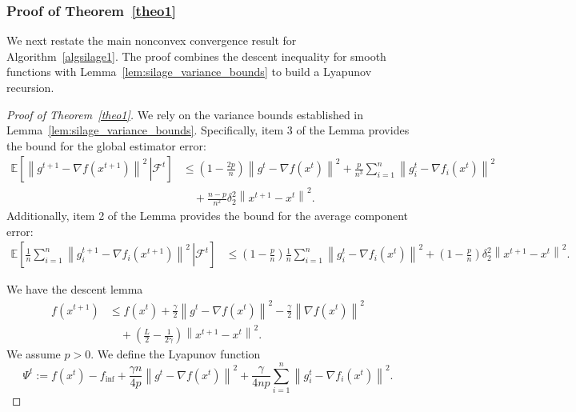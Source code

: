 \documentclass{article}
\newcommand{\sqn}[1]{\left\| #1 \right\|^2}
\newcommand{\finf}{f_\mathrm{inf}}
\newcommand{\eqdef}{:=}
\newcommand{\Expb}[2]{\mathbb{E}\!\left[\left. #1\,\right|#2 \right]}
\newcommand{\Expc}[1]{\Expb{#1}{\mathcal{F}^t}}
\theoremstyle{plain}
\begin{document}
\subsubsection*{Proof of Theorem~\ref{theo1}}

We next restate the main nonconvex convergence result for Algorithm~\ref{algsilage1}.
The proof combines the descent inequality for smooth functions with Lemma~\ref{lem:silage_variance_bounds} to build a Lyapunov recursion.

\silageMgeNNC*

\begin{proof}[Proof of Theorem~\ref{theo1}]

We rely on the variance bounds established in Lemma~\ref{lem:silage_variance_bounds}. Specifically, item 3 of the Lemma provides the bound for the global estimator error:
\begin{align*}
\Expc{\sqn{g^{t+1}-\nabla f(x^{t+1})}} &\leq \left(1-\frac{2p}{n}\right)\sqn{g^t-\nabla f(x^t)}+\frac{p}{n^3}\sum_{i=1}^n\sqn{g_{i}^t-\nabla f_{i}(x^{t})} \\
&\quad +\frac{n-p}{n^2}\delta_2^2\sqn{x^{t+1}-x^t}.
\end{align*}
Additionally, item 2 of the Lemma provides the bound for the average component error:
\begin{align*}
\Expc{\frac{1}{n}\sum_{i=1}^n\sqn{g_i^{t+1}-\nabla f_i(x^{t+1})}} &\leq \left(1-\frac{p}{n}\right)\frac{1}{n}\sum_{i=1}^n\sqn{g_i^{t}-\nabla f_i(x^{t})} +\left(1-\frac{p}{n}\right)\delta_2^2\sqn{x^{t+1}-x^t}.
\end{align*}

We have the descent lemma
\begin{align*}
f(x^{t+1})
&\leq f(x^t)
+\frac{\gamma}{2}\sqn{g^{t}-\nabla f(x^t)}
-\frac{\gamma}{2}\sqn{\nabla f(x^t)}\\
&\quad+\left(\frac{L}{2}-\frac{1}{2\gamma}\right)\sqn{x^{t+1}-x^t}.
\end{align*}
We assume $p>0$. We define the Lyapunov function 
$$\Psi^t\eqdef f(x^t)-\finf + \frac{\gamma n}{4p}\sqn{g^{t}-\nabla f(x^t)}+\frac{\gamma}{4np}\sum_{i=1}^n\sqn{g_i^t-\nabla f_{i}(x^{t})}.$$ 


\end{proof}
\end{document}
